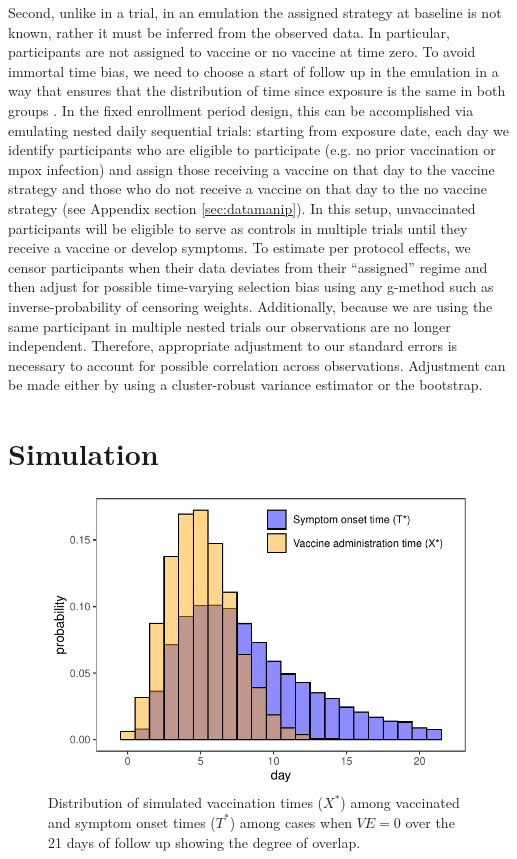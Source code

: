\documentclass[11pt]{article}
\begin{document}
Second, unlike in a trial, in an emulation the assigned strategy at baseline is not known, rather it must be inferred from the observed data. In particular, participants are not assigned to vaccine or no vaccine at time zero. To avoid immortal time bias, we need to choose a start of follow up in the emulation in a way that ensures that the distribution of time since exposure is the same in both groups \cite{hernan2016specifying}. In the fixed enrollment period design, this can be accomplished via emulating nested daily sequential trials: starting from exposure date, each day we identify participants who are eligible to participate (e.g. no prior vaccination or mpox infection) and assign those receiving a vaccine on that day to the vaccine strategy and those who do not receive a vaccine on that day to the no vaccine strategy (see Appendix section \ref{sec:datamanip}). In this setup, unvaccinated participants will be eligible to serve as controls in multiple trials until they receive a vaccine or develop symptoms. To estimate per protocol effects, we censor participants when their data deviates from their ``assigned'' regime and then adjust for possible time-varying selection bias using any g-method such as inverse-probability of censoring weights. Additionally, because we are using the same participant in multiple nested trials our observations are no longer independent. Therefore, appropriate adjustment to our standard errors is necessary to account for possible correlation across observations. Adjustment can be made either by using a cluster-robust variance estimator or the bootstrap.  

\section{Simulation}\label{sec:simulation}
\begin{figure}[t]
  \centering
  \includegraphics{../../../../3_figures/dist.pdf}
  \caption{Distribution of simulated vaccination times ($X^*$) among vaccinated and symptom onset times ($T^*$) among cases when $VE = 0$ over the 21 days of follow up showing the degree of overlap.}
  \label{fig:example_overlap}
\end{figure}
\end{document}
